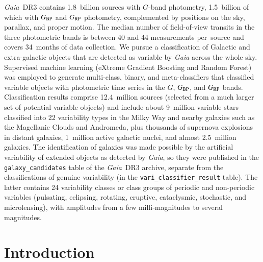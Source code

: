 \documentclass[longauth]{aa}
\def\gaia{\textit{Gaia}\xspace}
\def\gdr3{\textit{Gaia}~DR3\xspace}
\def\g{$G$\xspace}
\def\bp{$G_{\rm BP}$\xspace}
\def\rp{$G_{\rm RP}$\xspace}
\begin{document}
\date{Received 30 November 2022 / Accepted 17 December 2022}

 
  \abstract %
   {\gdr3 contains 1.8~billion sources with \g-band photometry, 1.5~billion of which with \bp and \rp photometry, complemented by positions on the sky, parallax, and proper motion. The median number of field-of-view transits in the three photometric bands is between 40 and 44 measurements per~source and covers 34~months of data collection.}
   {We pursue a classification of Galactic and extra-galactic objects that are detected as variable by \gaia across the whole sky.}
   {Supervised machine learning (eXtreme Gradient Boosting and Random Forest) was employed to generate multi-class, binary, and meta-classifiers that classified variable objects with photometric time series in the \g, \bp, and \rp bands.}
   {Classification results comprise 12.4~million sources (selected from a much larger set of potential variable objects) and include about 9~million variable stars classified into 22 variability types in the Milky Way and nearby galaxies such as the Magellanic Clouds and Andromeda, plus thousands of supernova explosions in distant galaxies, 1~million active galactic nuclei, and almost 2.5~million galaxies. The identification of galaxies was made possible by the artificial variability of extended objects as detected by \gaia, so they were published in the \texttt{galaxy\_candidates} table of the \gdr3 archive, separate from the classifications of genuine variability (in the \texttt{vari\_classifier\_result} table). The latter contains 24 variability classes or class groups of periodic and non-periodic variables (pulsating, eclipsing, rotating, eruptive, cataclysmic, stochastic, and microlensing), with amplitudes from a few milli-magnitudes to several magnitudes.}
  {}


\maketitle

\section{Introduction\label{sec:introduction}}
\end{document}
